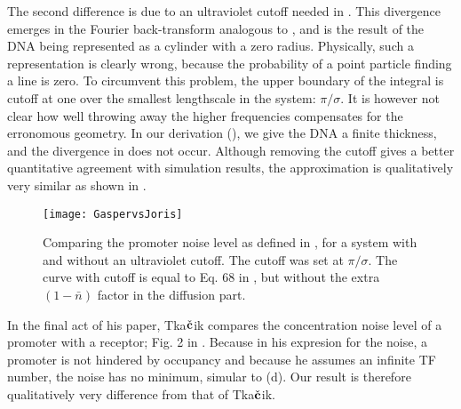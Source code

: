 The second difference is due to an ultraviolet cutoff needed in \cite{Tkacik2009}. This divergence emerges in the Fourier back-transform analogous to , and is the result of the DNA being represented as a cylinder with a zero radius. Physically, such a representation is clearly wrong, because the probability of a point particle finding a line is zero. To circumvent this problem, the upper boundary of the integral is cutoff at one over the smallest lengthscale in the system: $\pi/\sigma$. It is however not clear how well throwing away the higher frequencies compensates for the erronomous geometry. In our derivation (), we give the DNA a finite thickness, and the divergence in  does not occur. Although removing the cutoff gives a better quantitative agreement with simulation results, the approximation is qualitatively very similar as shown in .
\begin{figure}
\centering
\texttt{[image: GaspervsJoris]}
\caption{ Comparing the promoter noise level as defined in , for a system with and without an ultraviolet cutoff. The cutoff was set at $\pi/\sigma$. The curve with cutoff is equal to Eq. 68 in \cite{Tkacik2009}, but without the extra $(1-\bar{n})$ factor in the diffusion part.}
\end{figure}

In the final act of his paper, Tka$\check{\bf c}$ik compares the concentration noise level of a promoter with a receptor; Fig. 2 in \cite{Tkacik2009}. Because in his expresion for the noise, a promoter is not hindered by occupancy and because he assumes an infinite TF number, the noise has no minimum, simular to  (d). Our result is therefore qualitatively very difference from that of Tka$\check{\bf c}$ik.



